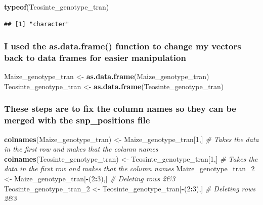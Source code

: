\documentclass[
]{article}
\newenvironment{Shaded}{\begin{snugshade}}{\end{snugshade}}
\newcommand{\CommentTok}[1]{\textcolor[rgb]{0.56,0.35,0.01}{\textit{#1}}}
\newcommand{\DecValTok}[1]{\textcolor[rgb]{0.00,0.00,0.81}{#1}}
\newcommand{\FunctionTok}[1]{\textcolor[rgb]{0.13,0.29,0.53}{\textbf{#1}}}
\newcommand{\NormalTok}[1]{#1}
\newcommand{\OtherTok}[1]{\textcolor[rgb]{0.56,0.35,0.01}{#1}}
\newcommand{\SpecialCharTok}[1]{\textcolor[rgb]{0.81,0.36,0.00}{\textbf{#1}}}
\begin{document}
\begin{Shaded}
\begin{Highlighting}[]
\FunctionTok{typeof}\NormalTok{(Teosinte\_genotype\_tran)}
\end{Highlighting}
\end{Shaded}

\begin{verbatim}
## [1] "character"
\end{verbatim}

\subsubsection{I used the as.data.frame() function to change my vectors
back to data frames for easier
manipulation}\label{i-used-the-as.data.frame-function-to-change-my-vectors-back-to-data-frames-for-easier-manipulation}

\begin{Shaded}
\begin{Highlighting}[]
\NormalTok{Maize\_genotype\_tran }\OtherTok{\textless{}{-}} \FunctionTok{as.data.frame}\NormalTok{(Maize\_genotype\_tran)}
\NormalTok{Teosinte\_genotype\_tran }\OtherTok{\textless{}{-}} \FunctionTok{as.data.frame}\NormalTok{(Teosinte\_genotype\_tran)}
\end{Highlighting}
\end{Shaded}

\subsubsection{These steps are to fix the column names so they can be
merged with the snp\_positions
file}\label{these-steps-are-to-fix-the-column-names-so-they-can-be-merged-with-the-snp_positions-file}

\begin{Shaded}
\begin{Highlighting}[]
\FunctionTok{colnames}\NormalTok{(Maize\_genotype\_tran) }\OtherTok{\textless{}{-}}\NormalTok{ Maize\_genotype\_tran[}\DecValTok{1}\NormalTok{,] }\CommentTok{\# Takes the data in the first row and makes that the column names}
\FunctionTok{colnames}\NormalTok{(Teosinte\_genotype\_tran) }\OtherTok{\textless{}{-}}\NormalTok{ Teosinte\_genotype\_tran[}\DecValTok{1}\NormalTok{,] }\CommentTok{\# Takes the data in the first row and makes that the column names}
\NormalTok{Maize\_genotype\_tran\_2 }\OtherTok{\textless{}{-}}\NormalTok{ Maize\_genotype\_tran[}\SpecialCharTok{{-}}\NormalTok{(}\DecValTok{2}\SpecialCharTok{:}\DecValTok{3}\NormalTok{),] }\CommentTok{\# Deleting rows 2\&3}
\NormalTok{Teosinte\_genotype\_tran\_2 }\OtherTok{\textless{}{-}}\NormalTok{ Teosinte\_genotype\_tran[}\SpecialCharTok{{-}}\NormalTok{(}\DecValTok{2}\SpecialCharTok{:}\DecValTok{3}\NormalTok{),] }\CommentTok{\# Deleting rows 2\&3}
\end{Highlighting}
\end{Shaded}
\end{document}
